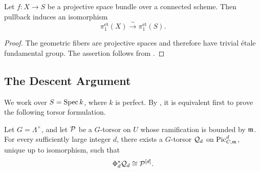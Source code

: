 \begin{cor}\label{cor:projective-bundle-fundamental-group}
Let $f\colon X\to S$ be a projective space bundle over a connected scheme.
Then pullback induces an isomorphism
\[
\pi_1^{\mathrm{et}}(X)\xrightarrow{\sim}\pi_1^{\mathrm{et}}(S).
\]
\end{cor}
\begin{proof}
The geometric fibers are projective spaces and therefore have trivial
\'etale fundamental group. The assertion follows from
.
\end{proof}

\subsection{The Descent Argument}

We work over $S=\Spec k$, where $k$ is perfect. By
, it is equivalent first to prove the
following torsor formulation.

\begin{theorem}\label{thm:GCFT_torsors}
Let $G=\Lambda^\times$, and let $\cP$ be a $G$-torsor on $U$ whose
ramification is bounded by $\mdls$. For every sufficiently large integer
$d$, there exists a $G$-torsor $\cQ_d$ on $\PicCm[d]$, unique up to
isomorphism, such that
\[
\Phi_d^*\cQ_d\cong\cP^{[d]}.
\]
\end{theorem}

